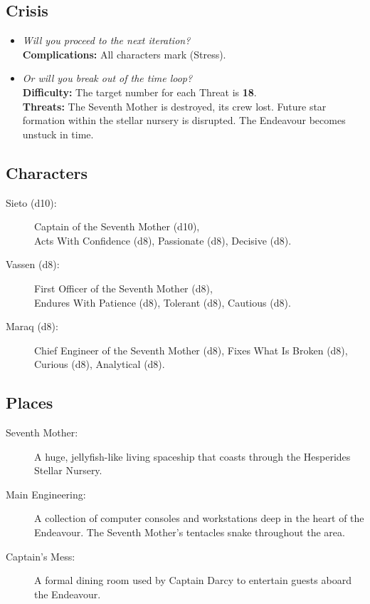 \documentclass[11pt, a5paper, parskip=half-, DIV=12]{scrartcl}
\begin{document}
\subsection*{Crisis}
\begin{itemize}
	\item \textit{Will you proceed to the next iteration?} \\ \textbf{Complications:} All characters mark  (Stress). 
	\item \textit{Or will you break out of the time loop?} \\ \textbf{Difficulty:} The target number for each Threat is \textbf{18}. \\ \textbf{Threats:} The Seventh Mother is destroyed, its crew lost. Future star formation within the stellar nursery is disrupted. The Endeavour becomes unstuck in time.
\end{itemize}
\newpage

\subsection*{Characters}
\begin{description}
	\item[Sieto (d10):] Captain of the Seventh Mother (d10), \\ Acts With Confidence (d8), Passionate (d8), Decisive (d8).
	\item[Vassen (d8):] First Officer of the Seventh Mother (d8), \\ Endures With Patience (d8), Tolerant (d8),  Cautious (d8).
	\item[Maraq (d8):] Chief Engineer of the Seventh Mother  (d8), Fixes What Is Broken (d8), Curious (d8), Analytical (d8).
\end{description}

\subsection*{Places}
\begin{description}
	\item[Seventh Mother:] A huge, jellyfish-like living spaceship that coasts through the Hesperides Stellar Nursery.
	\item[Main Engineering:] A collection of computer consoles and workstations deep in the heart of the Endeavour. The Seventh Mother's tentacles snake throughout the area.
	\item[Captain's Mess:] A formal dining room used by Captain Darcy to entertain guests aboard the Endeavour.
\end{description}
\end{document}

